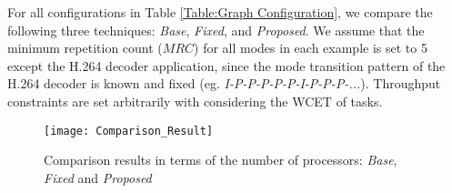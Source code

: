 \documentclass[prodmode,acmtecs]{acmsmall}
\begin{document}
\begin{table}[ht]
\centering
{}
\end{table}

For all configurations in Table \ref{Table:Graph Configuration}, we compare the following three techniques: \textit{Base}, \textit{Fixed}, and \textit{Proposed}. We assume that the minimum repetition count ($MRC$) for all modes in each example is set to 5 except the H.264 decoder application, since the mode transition pattern of the H.264 decoder is known and fixed (eg. \textit{I-P-P-P-P-P-I-P-P-P-...}). Throughput constraints are set arbitrarily with considering the WCET of tasks.

\begin{figure} [ht]
\centerline{\texttt{[image: Comparison\_Result]}}
\caption{Comparison results in terms of the number of processors: \textit{Base}, \textit{Fixed} and \textit{Proposed}}
\label{Figure:Comparison Result}
\end{figure}
\end{document}
